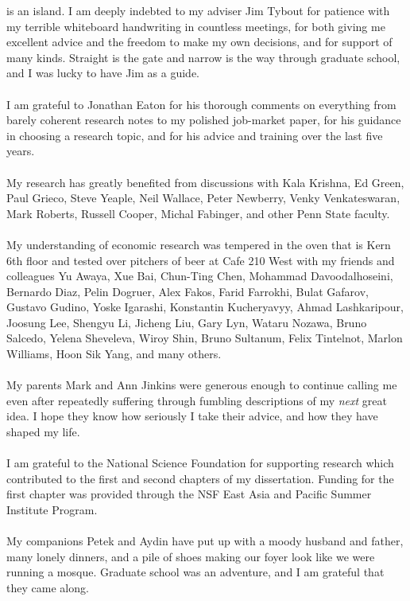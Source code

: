 
 is an island.  I am deeply indebted to my adviser Jim Tybout for patience with my terrible whiteboard handwriting in countless meetings, for both giving me excellent advice and the freedom to make my own decisions, and for support of many kinds.  Straight is the gate and narrow is the way through graduate school, and I was lucky to have Jim as a guide.\\
\vspace{1pt} \\
I am grateful to Jonathan Eaton for his thorough comments on everything from barely coherent research notes to my polished job-market paper, for his guidance in choosing a research topic, and for his advice and training over the last five years.\\
\vspace{1pt}\\
My research has greatly benefited from discussions with Kala Krishna, Ed Green, Paul Grieco, Steve Yeaple, Neil Wallace, Peter Newberry, Venky Venkateswaran, Mark Roberts, Russell Cooper, Michal Fabinger, and other Penn State faculty.\\
\vspace{1pt}\\
My understanding of economic research was tempered in the oven that is Kern 6th floor and tested over pitchers of beer at Cafe 210 West with my friends and colleagues Yu Awaya, Xue Bai, Chun-Ting Chen, Mohammad Davoodalhoseini, Bernardo Diaz, Pelin Dogruer, Alex Fakos, Farid Farrokhi, Bulat Gafarov, Gustavo Gudino, Yoske Igarashi, Konstantin Kucheryavyy, Ahmad Lashkaripour, Joosung Lee, Shengyu Li, Jicheng Liu, Gary Lyn, Wataru Nozawa, Bruno Salcedo, Yelena Sheveleva, Wiroy Shin, Bruno Sultanum, Felix Tintelnot, Marlon Williams, Hoon Sik Yang, and many others.\\
\vspace{1pt}\\
My parents Mark and Ann Jinkins were generous enough to continue calling me even after repeatedly suffering through fumbling descriptions of my \emph{next} great idea.  I hope they know how seriously I take their advice, and how they have shaped my life.\\
\vspace{1pt}\\
I am grateful to the National Science Foundation for supporting research which contributed to the first and second chapters of my dissertation.  Funding for the first chapter was provided through the NSF East Asia and Pacific Summer Institute Program.\\
\vspace{1pt}\\
My companions Petek and Aydin have put up with a moody husband and father, many lonely dinners, and a pile of shoes making our foyer look like we were running a mosque.  Graduate school was an adventure, and I am grateful that they came along.
